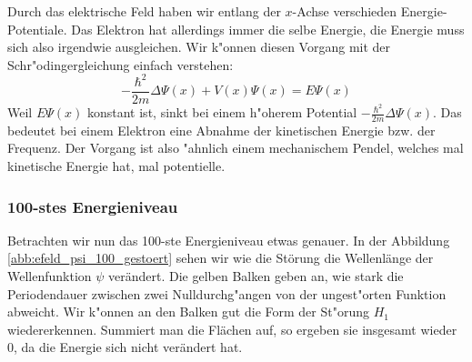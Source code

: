 \begin{refsection}
Durch das elektrische Feld haben wir entlang der $x$-Achse verschieden Energie-Potentiale.
Das Elektron hat allerdings immer die selbe Energie,
die Energie muss sich also irgendwie ausgleichen.
Wir k"onnen diesen Vorgang mit der Schr"odingergleichung einfach verstehen:
\[
-\frac{\hbar^2}{2m}\Delta\Psi(x) + V(x)\Psi(x)
=
E \Psi(x)
\]
Weil $E \Psi(x)$ konstant ist, sinkt bei einem h"oherem Potential $-\frac{\hbar^2}{2m}\Delta\Psi(x)$.
Das bedeutet bei einem Elektron eine Abnahme der kinetischen Energie bzw. der Frequenz.
Der Vorgang ist also "ahnlich einem mechanischem Pendel, 
welches mal kinetische Energie hat, mal potentielle.



\subsubsection{100-stes Energieniveau}
Betrachten wir nun das 100-ste Energieniveau etwas genauer.
In der Abbildung \ref{abb:efeld_psi_100_gestoert} sehen wir wie die St\"orung 
die Wellenl\"ange der Wellenfunktion $\psi$ ver\"andert. 
Die gelben Balken geben an, wie stark die Periodendauer zwischen zwei Nulldurchg"angen
von der ungest"orten Funktion abweicht.
Wir k"onnen an den Balken gut die Form der St"orung $H_1$ wiedererkennen.
Summiert man die Fl\"achen auf, so ergeben sie insgesamt wieder $0$, da die Energie sich nicht ver\"andert hat.



\end{refsection}
